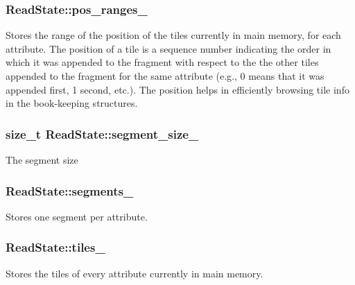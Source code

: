 \subsubsection[{pos\+\_\+ranges\+\_\+}]{ Read\+State\+::pos\+\_\+ranges\+\_\+\hspace{0.3cm}{\ttfamily [private]}}\label{classReadState_aedc33e4b6a486f30e0a0c4d40175d3dd}
Stores the range of the position of the tiles currently in main memory, for each attribute. The position of a tile is a sequence number indicating the order in which it was appended to the fragment with respect to the the other tiles appended to the fragment for the same attribute (e.\+g., 0 means that it was appended first, 1 second, etc.). The position helps in efficiently browsing tile info in the book-\/keeping structures. \hypertarget{classReadState_ace4b01c72d47f9cf2eaa10e2e4628696}{}
\subsubsection[{segment\+\_\+size\+\_\+}]{\setlength{\rightskip}{0pt plus 5cm}size\+\_\+t Read\+State\+::segment\+\_\+size\+\_\+\hspace{0.3cm}{\ttfamily [private]}}\label{classReadState_ace4b01c72d47f9cf2eaa10e2e4628696}
The segment size \hypertarget{classReadState_a6037655555de80978e7139ad835182e9}{}
\subsubsection[{segments\+\_\+}]{ Read\+State\+::segments\+\_\+\hspace{0.3cm}{\ttfamily [private]}}\label{classReadState_a6037655555de80978e7139ad835182e9}
Stores one segment per attribute. \hypertarget{classReadState_a5b4ee76ddc26b1b5d7fd36f0695bc31f}{}
\subsubsection[{tiles\+\_\+}]{ Read\+State\+::tiles\+\_\+\hspace{0.3cm}{\ttfamily [private]}}\label{classReadState_a5b4ee76ddc26b1b5d7fd36f0695bc31f}
Stores the tiles of every attribute currently in main memory. \hypertarget{classReadState_a575195a908596181416a7ea0c5b45eeb}{}
